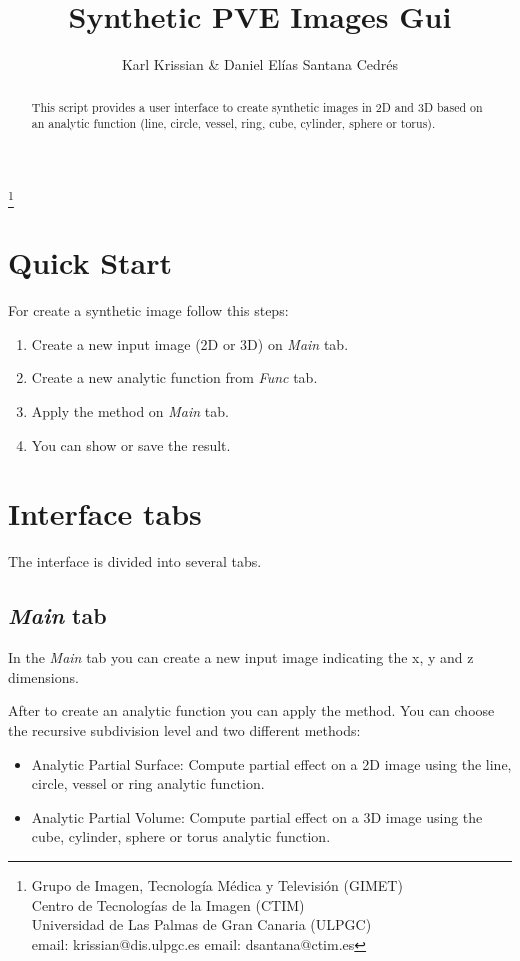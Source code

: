 \documentclass{article}
\begin{document}
\title{Synthetic PVE Images Gui}
\author{Karl Krissian \& Daniel El\'ias Santana Cedr\'es}
\thanks{
Grupo de Imagen, Tecnolog\'ia M\'edica y Televisi\'on (GIMET)\\
Centro de Tecnolog\'ias de la Imagen (CTIM)\\
Universidad de Las Palmas de Gran Canaria (ULPGC)\\
email: krissian@dis.ulpgc.es
email: dsantana@ctim.es
}


\maketitle

\begin{abstract}
This script provides a user interface to create synthetic images in 2D and 3D based on an analytic function (line, circle, vessel, ring, cube, cylinder, sphere or torus).
\end{abstract}


\section{Quick Start}

For create a synthetic image follow this steps:
\begin{enumerate}
  \item Create a new input image (2D or 3D) on \emph{Main} tab.
  \item Create a new analytic function from \emph{Func} tab.
  \item Apply the method on \emph{Main} tab.
  \item You can show or save the result.
\end{enumerate}

\section{Interface tabs}

The interface is divided into several tabs.

\subsection{\emph{Main} tab}
In the \emph{Main} tab you can create a new input image indicating the x, y and z dimensions.

After to create an analytic function you can apply the method. You can choose the recursive subdivision level and two different methods:
\begin{itemize}
	\item Analytic Partial Surface: Compute partial effect on a 2D image using the line, circle, vessel or ring analytic function.
	\item Analytic Partial Volume: Compute partial effect on a 3D image using the cube, cylinder, sphere or torus analytic function.
\end{itemize}
\end{document}
